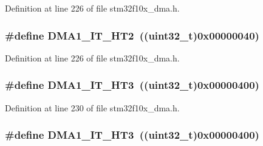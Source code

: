 Definition at line 226 of file stm32f10x\+\_\+dma.\+h.

\subsubsection[{\texorpdfstring{D\+M\+A1\+\_\+\+I\+T\+\_\+\+H\+T2}{DMA1_IT_HT2}}]{\setlength{\rightskip}{0pt plus 5cm}\#define D\+M\+A1\+\_\+\+I\+T\+\_\+\+H\+T2~(({\bf uint32\+\_\+t})0x00000040)}\hypertarget{group___d_m_a__interrupts__definition_gab2d608582c350ed00412f7a09fe10ae7}{}\label{group___d_m_a__interrupts__definition_gab2d608582c350ed00412f7a09fe10ae7}


Definition at line 226 of file stm32f10x\+\_\+dma.\+h.

\subsubsection[{\texorpdfstring{D\+M\+A1\+\_\+\+I\+T\+\_\+\+H\+T3}{DMA1_IT_HT3}}]{\setlength{\rightskip}{0pt plus 5cm}\#define D\+M\+A1\+\_\+\+I\+T\+\_\+\+H\+T3~(({\bf uint32\+\_\+t})0x00000400)}\hypertarget{group___d_m_a__interrupts__definition_ga1e3b12ceb8ba5b8d129d5bdee21904de}{}\label{group___d_m_a__interrupts__definition_ga1e3b12ceb8ba5b8d129d5bdee21904de}


Definition at line 230 of file stm32f10x\+\_\+dma.\+h.

\subsubsection[{\texorpdfstring{D\+M\+A1\+\_\+\+I\+T\+\_\+\+H\+T3}{DMA1_IT_HT3}}]{\setlength{\rightskip}{0pt plus 5cm}\#define D\+M\+A1\+\_\+\+I\+T\+\_\+\+H\+T3~(({\bf uint32\+\_\+t})0x00000400)}\hypertarget{group___d_m_a__interrupts__definition_ga1e3b12ceb8ba5b8d129d5bdee21904de}{}\label{group___d_m_a__interrupts__definition_ga1e3b12ceb8ba5b8d129d5bdee21904de}


